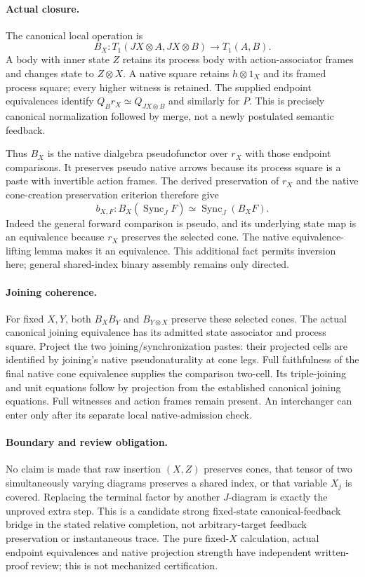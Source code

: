 \documentclass{article}
\begin{document}
\paragraph{Actual closure.} The canonical local operation is
\[
 B_X:T_1(JX\otimes A,JX\otimes B)\to T_1(A,B).
\]
A body with inner state $Z$ retains its process body with action-associator frames and changes state to $Z\otimes X$. A native square retains $h\otimes1_X$ and its framed process square; every higher witness is retained. The supplied endpoint equivalences identify $Q_Br_X\simeq Q_{JX\otimes B}$ and similarly for $P$. This is precisely canonical normalization followed by merge, not a newly postulated semantic feedback.

Thus $B_X$ is the native dialgebra pseudofunctor over $r_X$ with those endpoint comparisons. It preserves pseudo native arrows because its process square is a paste with invertible action frames. The derived preservation of $r_X$ and the native cone-creation preservation criterion therefore give
\[
 b_{X,F}:B_X(\operatorname{Sync}_JF)\simeq\operatorname{Sync}_J(B_XF).
\]
Indeed the general forward comparison is pseudo, and its underlying state map is an equivalence because $r_X$ preserves the selected cone. The native equivalence-lifting lemma makes it an equivalence. This additional fact permits inversion here; general shared-index binary assembly remains only directed.

\paragraph{Joining coherence.} For fixed $X,Y$, both $B_XB_Y$ and $B_{Y\otimes X}$ preserve these selected cones. The actual canonical joining equivalence has its admitted state associator and process square. Project the two joining/synchronization pastes: their projected cells are identified by joining's native pseudonaturality at cone legs. Full faithfulness of the final native cone equivalence supplies the comparison two-cell. Its triple-joining and unit equations follow by projection from the established canonical joining equations. Full witnesses and action frames remain present. An interchanger can enter only after its separate local native-admission check.

\paragraph{Boundary and review obligation.} No claim is made that raw insertion $(X,Z)$ preserves cones, that tensor of two simultaneously varying diagrams preserves a shared index, or that variable $X_j$ is covered. Replacing the terminal factor by another $J$-diagram is exactly the unproved extra step. This is a candidate strong fixed-state canonical-feedback bridge in the stated relative completion, not arbitrary-target feedback preservation or instantaneous trace. The pure fixed-$X$ calculation, actual endpoint equivalences and native projection strength have independent written-proof review; this is not mechanized certification.
\end{document}
